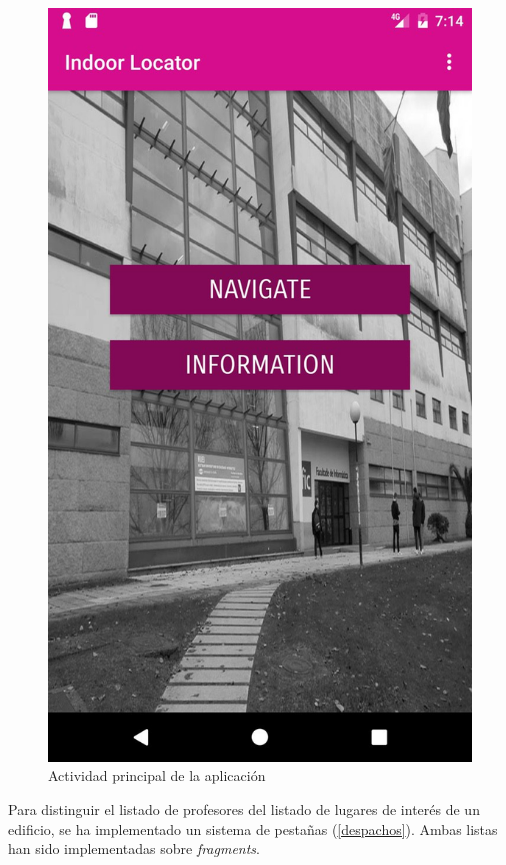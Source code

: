 \documentclass[12pt, a4paper, titlepage]{article}
\begin{document}
	\begin{figure}[h!]
		\begin{center}
			\includegraphics[scale=0.30]{img/main.jpg}
			\caption{Actividad principal de la aplicación}
			\label{mainactivity}
		\end{center}
	\end{figure}
	
	Para distinguir el listado de profesores del listado de lugares de interés de un edificio, se ha implementado un sistema de pestañas (\autoref{despachos}). Ambas listas han sido implementadas sobre \textit{fragments}. 
	
\end{document}
